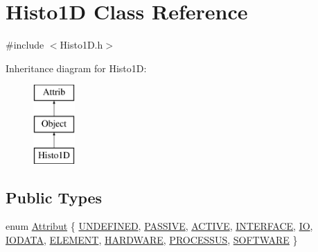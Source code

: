 \hypertarget{classHisto1D}{}\section{Histo1D Class Reference}
\label{classHisto1D}


{\ttfamily \#include $<$Histo1\+D.\+h$>$}

Inheritance diagram for Histo1D\+:\begin{figure}[H]
\begin{center}
\leavevmode
\includegraphics[height=3.000000cm]{classHisto1D}
\end{center}
\end{figure}
\subsection*{Public Types}
\begin{DoxyCompactItemize}
\item 
enum \hyperlink{classAttrib_a69e171d7cc6417835a5a306d3c764235}{Attribut} \{ \newline
\hyperlink{classAttrib_a69e171d7cc6417835a5a306d3c764235a3a8da2ab97dda18aebab196fe4100531}{U\+N\+D\+E\+F\+I\+N\+ED}, 
\hyperlink{classAttrib_a69e171d7cc6417835a5a306d3c764235a2bfb2af57b87031d190a05fe25dd92ed}{P\+A\+S\+S\+I\+VE}, 
\hyperlink{classAttrib_a69e171d7cc6417835a5a306d3c764235a3b1fec929c0370d1436f2f06e298fb0d}{A\+C\+T\+I\+VE}, 
\hyperlink{classAttrib_a69e171d7cc6417835a5a306d3c764235aa27c16b480a369ea4d18b07b2516bbc7}{I\+N\+T\+E\+R\+F\+A\+CE}, 
\newline
\hyperlink{classAttrib_a69e171d7cc6417835a5a306d3c764235a1420a5b8c0540b2af210b6975eded7f9}{IO}, 
\hyperlink{classAttrib_a69e171d7cc6417835a5a306d3c764235a0af3b0d0ac323c1704e6c69cf90add28}{I\+O\+D\+A\+TA}, 
\hyperlink{classAttrib_a69e171d7cc6417835a5a306d3c764235a7788bc5dd333fd8ce18562b269c9dab1}{E\+L\+E\+M\+E\+NT}, 
\hyperlink{classAttrib_a69e171d7cc6417835a5a306d3c764235a61ceb22149f365f1780d18f9d1459423}{H\+A\+R\+D\+W\+A\+RE}, 
\newline
\hyperlink{classAttrib_a69e171d7cc6417835a5a306d3c764235a75250e29692496e73effca2c0330977f}{P\+R\+O\+C\+E\+S\+S\+US}, 
\hyperlink{classAttrib_a69e171d7cc6417835a5a306d3c764235a103a67cd0b8f07ef478fa45d4356e27b}{S\+O\+F\+T\+W\+A\+RE}
 \}
\end{DoxyCompactItemize}
